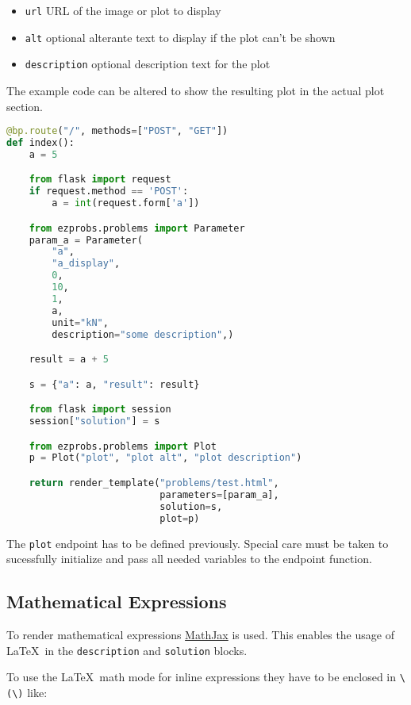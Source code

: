 \begin{itemize}
  \item \verb+url+ URL of the image or plot to display
  \item \verb+alt+ optional alterante text to display if the plot can't be shown
  \item \verb+description+ optional description text for the plot
\end{itemize}

The example code can be altered to show the resulting plot in the actual plot section.

\begin{lstlisting}[language=python]
@bp.route("/", methods=["POST", "GET"])
def index():
    a = 5

    from flask import request
    if request.method == 'POST':
        a = int(request.form['a'])

    from ezprobs.problems import Parameter
    param_a = Parameter(
        "a",
        "a_display",
        0,
        10,
        1,
        a,
        unit="kN",
        description="some description",)

    result = a + 5

    s = {"a": a, "result": result}

    from flask import session
    session["solution"] = s

    from ezprobs.problems import Plot
    p = Plot("plot", "plot alt", "plot description")

    return render_template("problems/test.html",
                           parameters=[param_a],
                           solution=s,
                           plot=p)
\end{lstlisting}

The \verb+plot+ endpoint has to be defined previously. Special care must be
taken to sucessfully initialize and pass all needed variables to the endpoint
function.

\subsection{Mathematical Expressions}

To render mathematical expressions \href{https://www.mathjax.org/}{MathJax} is
used. This enables the usage of \LaTeX\ in the \verb+description+ and
\verb+solution+ blocks.

To use the \LaTeX\ math mode for inline expressions they have to be enclosed in \verb+\(\)+ like:

